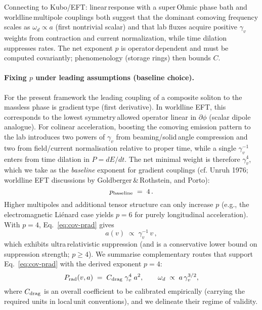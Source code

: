 \documentclass[11pt]{article}
\begin{document}
Connecting to Kubo/EFT: linear\,response with a super\,Ohmic phase bath and worldline\,multipole couplings both suggest that the dominant comoving frequency scales as $\omega_d\propto a$ (first nontrivial scalar) and that lab fluxes acquire positive $\gamma_v$ weights from contraction and current normalization, while time dilation suppresses rates. The net exponent $p$ is operator\,dependent and must be computed covariantly; phenomenology (storage rings) then bounds $C$.

\paragraph{Fixing $p$ under leading assumptions (baseline choice).} For the present framework the leading coupling of a composite soliton to the massless phase is gradient\,type (first derivative). In worldline EFT, this corresponds to the lowest symmetry\,allowed operator linear in $\partial\phi$ (scalar dipole analogue). For colinear acceleration, boosting the comoving emission pattern to the lab introduces two powers of $\gamma_v$ from beaming/solid\,angle compression and two from field/current normalisation relative to proper time, while a single $\gamma_v^{-1}$ enters from time dilation in $P=dE/dt$. The net minimal weight is therefore $\gamma_v^{4}$, which we take as the \emph{baseline} exponent for gradient couplings (cf. Unruh 1976; worldline EFT discussions by Goldberger\,\&\,Rothstein, and Porto):
\begin{equation}
  p_{\rm baseline} \;=\; 4\,.
\end{equation}
Higher multipoles and additional tensor structure can only increase $p$ (e.g., the electromagnetic Liénard case yields $p=6$ for purely longitudinal acceleration). With $p=4$, Eq.~\eqref{eq:cov-prad} gives
\begin{equation}
  a(v) \;\propto\; \gamma_v^{-1}\, v\,,
\end{equation}
which exhibits ultra\,relativistic suppression (and is a conservative lower bound on suppression strength; $p\ge 4$).
We summarise complementary routes that support Eq.~\eqref{eq:cov-prad} with the derived exponent $p=4$:
\begin{equation}
  P_{\rm rad}(v,a) \;=\; C_{\rm drag}\; \gamma_v^{4}\; a^{2},\qquad \omega_d\;\propto\; a\,\gamma_v^{3/2},
\end{equation}
where $C_{\rm drag}$ is an overall coefficient to be calibrated empirically (carrying the required units in local\,unit conventions), and we delineate their regime of validity.
\end{document}
